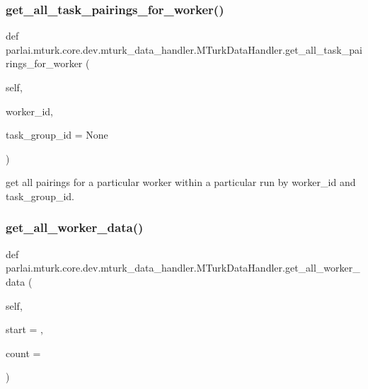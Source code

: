\subsubsection{\texorpdfstring{get\+\_\+all\+\_\+task\+\_\+pairings\+\_\+for\+\_\+worker()}{get\_all\_task\_pairings\_for\_worker()}}
{\footnotesize\ttfamily def parlai.\+mturk.\+core.\+dev.\+mturk\+\_\+data\+\_\+handler.\+M\+Turk\+Data\+Handler.\+get\+\_\+all\+\_\+task\+\_\+pairings\+\_\+for\+\_\+worker (\begin{DoxyParamCaption}\item[{}]{self,  }\item[{}]{worker\+\_\+id,  }\item[{}]{task\+\_\+group\+\_\+id = {\ttfamily None} }\end{DoxyParamCaption})}

\begin{DoxyVerb}get all pairings for a particular worker within a particular run by worker_id
and task_group_id.
\end{DoxyVerb}
 \mbox{\label{classparlai_1_1mturk_1_1core_1_1dev_1_1mturk__data__handler_1_1MTurkDataHandler_a3e7435a5ea6af94b4d668c095184a234}} 
\subsubsection{\texorpdfstring{get\+\_\+all\+\_\+worker\+\_\+data()}{get\_all\_worker\_data()}}
{\footnotesize\ttfamily def parlai.\+mturk.\+core.\+dev.\+mturk\+\_\+data\+\_\+handler.\+M\+Turk\+Data\+Handler.\+get\+\_\+all\+\_\+worker\+\_\+data (\begin{DoxyParamCaption}\item[{}]{self,  }\item[{}]{start = {},  }\item[{}]{count = {} }\end{DoxyParamCaption})}

